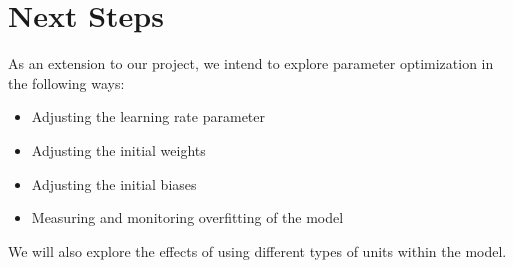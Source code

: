 \section{Next Steps}

As an extension to our project, we intend to explore parameter optimization in the following ways:
\begin{itemize}
  \item Adjusting the learning rate parameter
  \item Adjusting the initial weights 
  \item Adjusting the initial biases
  \item Measuring and monitoring overfitting of the model
\end{itemize}

We will also explore the effects of using different types of units within the model. 


